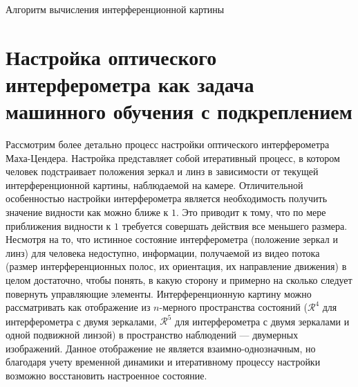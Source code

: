 \begin{algorithm}[ht]
	\SetAlgoLined
\caption{Алгоритм вычисления интерференционной картины}
\label{alg:interf_img_calc}
\end{algorithm}


\section{Настройка оптического интерферометра как задача машинного обучения с подкреплением}\label{sec:ch2/sect2}

Рассмотрим более детально процесс настройки оптического интерферометра Маха-Цендера. Настройка представляет собой итеративный процесс, в котором человек подстраивает положения зеркал и линз в зависимости от текущей интерференционной картины, наблюдаемой на камере. Отличительной особенностью настройки интерферометра является необходимость получить значение видности как можно ближе к $1$. Это приводит к тому, что по мере приближения видности к $1$ требуется совершать действия все меньшего размера. Несмотря на то, что истинное состояние интерферометра (положение зеркал и линз) для человека недоступно, информации, получаемой из видео потока (размер интерференционных полос, их ориентация, их направление движения) в целом достаточно, чтобы понять, в какую сторону и примерно на сколько следует повернуть управляющие элементы. Интерференционную картину можно рассматривать как отображение из $n$-мерного пространства состояний ($\mathcal{R}^4$ для интерферометра с двумя зеркалами, $\mathcal{R}^5$ для интерферометра с двумя зеркалами и одной подвижной линзой) в пространство наблюдений --- двумерных изображений. Данное отображение не является взаимно-однозначным, но благодаря учету временной динамики и итеративному процессу настройки возможно восстановить настроенное состояние. 


